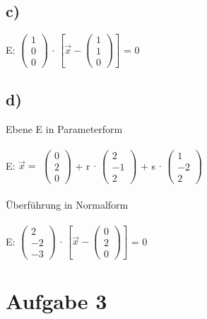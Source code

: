 \documentclass{article}
\begin{document}
	\subsection*{c)}
	E: 
	$\left(\begin{array}{c}
	1 \\ 0 \\ 0
	\end{array}\right)$
	$\cdot$ $\left[\vec{x} - 
	\left(\begin{array}{c}
	1 \\ 1 \\ 0
	\end{array}\right)
	\right]$
	= 0 \\
	\subsection*{d)}
	Ebene E in Parameterform \\
	\\
	E: $\vec{x} =$
	$\left(\begin{array}{c}
		0 \\ 2 \\ 0
	\end{array}\right)$ + 
	r $\cdot$ 
	$\left(\begin{array}{c}
	2 \\ -1 \\ 2
	\end{array}\right)$ +
	s $\cdot$ 
	$\left(\begin{array}{c}
	1 \\ -2 \\ 2
	\end{array}\right)$ \\ \\
	Überführung in Normalform \\ \\
	E:
	$\left(\begin{array}{c}
	2 \\ -2 \\ -3
	\end{array}\right)$
	$\cdot$
	$\left[\vec{x} - \left(\begin{array}{c}
		0 \\ 2 \\ 0
	\end{array}\right) \right]$ = 0
	\section*{Aufgabe 3}
\end{document}
